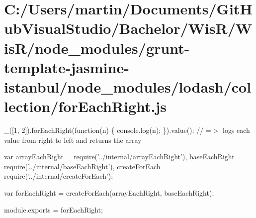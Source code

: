\hypertarget{_c_1_2_users_2martin_2_documents_2_git_hub_visual_studio_2_bachelor_2_wis_r_2_wis_r_2node_module4e21f2b488b14f7d27ff100a4e449020}{}\section{C\+:/\+Users/martin/\+Documents/\+Git\+Hub\+Visual\+Studio/\+Bachelor/\+Wis\+R/\+Wis\+R/node\+\_\+modules/grunt-\/template-\/jasmine-\/istanbul/node\+\_\+modules/lodash/collection/for\+Each\+Right.\+js}
\+\_\+(\mbox{[}1, 2\mbox{]}).for\+Each\+Right(function(n) \{ console.\+log(n); \}).value(); // =$>$ logs each value from right to left and returns the array


\begin{DoxyCodeInclude}
var arrayEachRight = require(\textcolor{stringliteral}{'../internal/arrayEachRight'}),
    baseEachRight = require(\textcolor{stringliteral}{'../internal/baseEachRight'}),
    createForEach = require(\textcolor{stringliteral}{'../internal/createForEach'});

var forEachRight = createForEach(arrayEachRight, baseEachRight);

module.exports = forEachRight;
\end{DoxyCodeInclude}
 